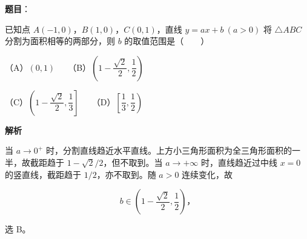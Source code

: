\begin{answer}

\textbf{题目}：

已知点 $A(-1,0)$，$B(1,0)$，$C(0,1)$，直线 $y=ax+b\ (a>0)$ 将 $\triangle ABC$ 分割为面积相等的两部分，则 $b$ 的取值范围是\mbox{（　　）}

（A）$(0,1)$　　（B）$\left(1-\dfrac{\sqrt2}{2},\dfrac12\right)$

（C）$\left(1-\dfrac{\sqrt2}{2},\dfrac13\right]$　　（D）$\left[\dfrac13,\dfrac12\right)$

\textbf{解析}

当 $a\to0^+$ 时，分割直线趋近水平直线。上方小三角形面积为全三角形面积的一半，故截距趋于 $1-\sqrt2/2$，但不取到。当 $a\to+\infty$ 时，直线趋近过中线 $x=0$ 的竖直线，截距趋于 $1/2$，亦不取到。随 $a>0$ 连续变化，故

\nopagebreak[4]
\[b\in\left(1-\frac{\sqrt2}{2},\frac12\right)\text{，}\]

选 B。


\end{answer}

